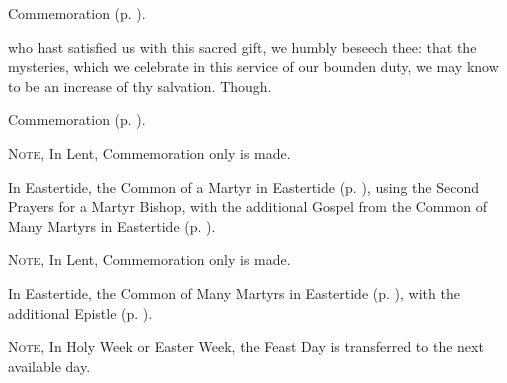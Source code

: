 \begin{rubric}
	Commemoration  (p. \pageref{JustinSecret}).
\end{rubric}

\postcommunion\label{TiburtiusPostcommunion}
 who hast satisfied us with this sacred gift, we humbly beseech thee: that the mysteries, which we celebrate in this service of our bounden duty, we may know to be an increase of thy salvation. Though.

\begin{rubric}
	Commemoration  (p. \pageref{JustinPostcommunion}).
\end{rubric}


\clearpage
{}

\begin{rubric}
	\textsc{Note,} In Lent, Commemoration only is made.
\end{rubric}

\begin{rubric}
	In Eastertide, the Common of a Martyr in Eastertide (p. \pageref{CommonMartyrEaster}), using the Second Prayers for a Martyr Bishop, with the additional Gospel from the Common of Many Martyrs in Eastertide (p. \pageref{John1620}).
\end{rubric}



\begin{rubric}
	\textsc{Note,} In Lent, Commemoration only is made.
\end{rubric}

\begin{rubric}
	In Eastertide, the Common of Many Martyrs in Eastertide (p. \pageref{CommonMartyrsEaster}), with the additional Epistle (p. \pageref{Revelation191}).
\end{rubric}



\begin{rubric}
	\textsc{Note,} In Holy Week or Easter Week, the Feast Day is transferred to the next available day.
\end{rubric}

\introit
{}

